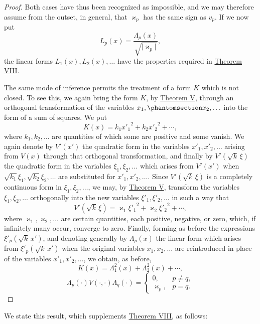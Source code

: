 \documentclass[b5paper,twoside]{article}
\newcommand{\originalpage}[1]{\phantomsection\label{origpage:#1}}
\begin{document}
\begin{proof}
Both cases have thus been recognized as impossible, and we may therefore
assume from the outset, in general, that $\varkappa_p$ has the same sign as
$v_p$. If we now put
\[
  L_p(x)=\frac{\Lambda_p(x)}{\sqrt{\lvert\varkappa_p\rvert}},
\]
the linear forms $L_1(x),L_2(x),\ldots$ have the properties required in
\hyperref[thm:VIII]{Theorem VIII}.

The same mode of inference permits the treatment of a form $K$ which is not
closed. To see this, we again bring the form $K$, by
\hyperref[thm:V]{Theorem V}, through an orthogonal transformation of the
variables $x_1,
\originalpage{215}
x_2,\ldots$ into the form of a sum of squares. We put
\[
  K(x)=k_1{x'_1}^{2}+k_2{x'_2}^{2}+\cdots,
\]
where $k_1,k_2,\ldots$ are quantities of which some are positive and some
vanish. We again denote by $V'(x')$ the quadratic form in the variables
$x'_1,x'_2,\ldots$ arising from $V(x)$ through that orthogonal
transformation, and finally by $V'(\sqrt{k}\,\xi)$ the quadratic form in the
variables $\xi_1,\xi_2,\ldots$ which arises from $V'(x')$ when
$\sqrt{k_1}\xi_1,\sqrt{k_2}\xi_2,\ldots$ are substituted for
$x'_1,x'_2,\ldots$. Since $V'(\sqrt{k}\,\xi)$ is a completely continuous
form in $\xi_1,\xi_2,\ldots$, we may, by \hyperref[thm:V]{Theorem V},
transform the variables $\xi_1,\xi_2,\ldots$ orthogonally into the new
variables $\xi'_1,\xi'_2,\ldots$ in such a way that
\[
  V'(\sqrt{k}\,\xi)
  =\varkappa_1{\xi'_1}^{2}+\varkappa_2{\xi'_2}^{2}+\cdots,
\]
where $\varkappa_1,\varkappa_2,\ldots$ are certain quantities, each positive,
negative, or zero, which, if infinitely many occur, converge to zero. Finally,
forming as before the expressions $\xi'_p(\sqrt{k}\,x')$, and denoting
generally by $\Lambda_p(x)$ the linear form
which arises from $\xi'_p(\sqrt{k}\,x')$ when the original variables
$x_1,x_2,\ldots$ are reintroduced in place of the variables
$x'_1,x'_2,\ldots$, we obtain, as before,
\[
  K(x)=\Lambda_1^2(x)+\Lambda_2^2(x)+\cdots,
\]
\[
  \Lambda_p(\mathord{\cdot})V(\mathord{\cdot},\mathord{\cdot})
  \Lambda_q(\mathord{\cdot})
  =\begin{cases}
     0, & p\ne q,\\
     \varkappa_p, & p=q.
   \end{cases}
\]
\end{proof}

We state this result, which supplements \hyperref[thm:VIII]{Theorem VIII},
as follows:
\end{document}
